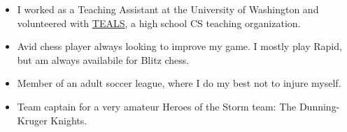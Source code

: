 

\begin{cvparagraph}


\begin{justify}
\begin{itemize}[leftmargin=2ex, nosep]
    \setlength{\parskip}{0pt}
    \setlength\itemsep{0.15em}
    \renewcommand{\labelitemi}{\bullet}
    \item I worked as a Teaching Assistant at the University of Washington and volunteered with \href{https://www.microsoft.com/en-us/teals}{\underline{TEALS}}, a high school CS teaching organization. 
    \item Avid chess player always looking to improve my game. I mostly play Rapid, but am always availabile for Blitz chess.
    \item Member of an adult soccer league, where I do my best not to injure myself.
    \item Team captain for a very amateur Heroes of the Storm team: The Dunning-Kruger Knights.

\end{itemize}
\end{justify}

\end{cvparagraph}
